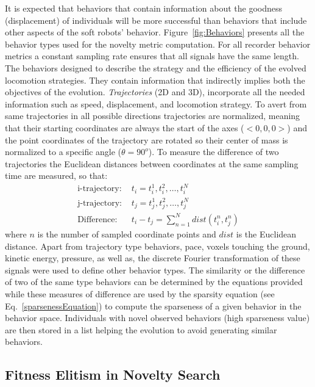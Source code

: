 \documentclass{sig-alternate}
\begin{document}
It is expected that behaviors that contain information about the goodness (displacement) of individuals will be more successful than behaviors that include other aspects of the soft robots' behavior. Figure~\ref{fig:Behaviors} presents all the behavior types used for the novelty metric computation. For all recorder behavior metrics a constant sampling rate ensures that all signals have the same length. The behaviors designed to describe the strategy and the efficiency of the evolved locomotion strategies. They contain information that indirectly implies both the objectives of the evolution. \emph{Trajectories} (2D and 3D), incorporate all the needed information such as speed, displacement, and locomotion strategy. To avert from same trajectories in all possible directions trajectories are normalized, meaning that their starting coordinates are always the start of the axes ($<0,0,0>$) and the point coordinates of the trajectory are rotated so their center of mass is normalized to a specific angle ($\theta = 90^{o}$). To measure the difference of two trajectories the Euclidean distances between coordinates at the same sampling time are measured, so that:
\begin{align}
\text{i-trajectory: } &t_i = t_i^1, t_i^2, \ldots, t_i^N\\
\text{j-trajectory: } &t_j = t_j^1, t_j^2, \ldots, t_j^N\\
\text{Difference: } &t_i - t_j = \sum_{n=1}^{N} dist( t_i^n, t_j^n )
\end{align}
where $n$ is the number of sampled coordinate points and $dist$ is the Euclidean distance. Apart from trajectory type behaviors, pace, voxels touching the ground, kinetic energy, pressure, as well as, the discrete Fourier transformation of these signals were used to define other behavior types. The similarity or the difference of two of the same type behaviors can be determined by the equations provided while these measures of difference are used by the sparsity equation (see Eq.~\ref{sparsenessEquation}) to compute the sparseness of a given behavior in the behavior space. Individuals with novel observed behaviors (high sparseness value) are then stored in a list helping the evolution to avoid generating similar behaviors.


\subsection{Fitness Elitism in Novelty Search}
\end{document}
